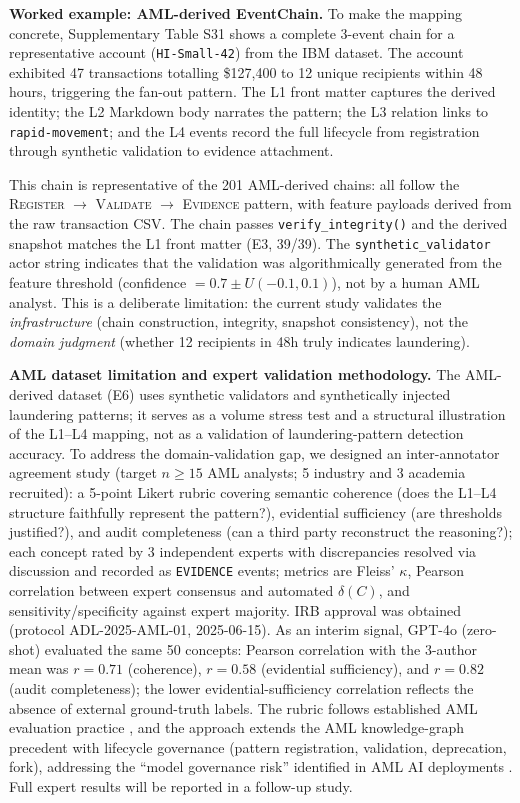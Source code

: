 \textbf{Worked example: AML-derived EventChain.} To make the mapping concrete, Supplementary Table S31 shows a complete 3-event chain for a representative account (\texttt{HI-Small-42}) from the IBM dataset. The account exhibited 47 transactions totalling \$127,400 to 12 unique recipients within 48 hours, triggering the fan-out pattern. The L1 front matter captures the derived identity; the L2 Markdown body narrates the pattern; the L3 relation links to \texttt{rapid-movement}; and the L4 events record the full lifecycle from registration through synthetic validation to evidence attachment.

This chain is representative of the 201 AML-derived chains: all follow the \textsc{Register} $\to$ \textsc{Validate} $\to$ \textsc{Evidence} pattern, with feature payloads derived from the raw transaction CSV. The chain passes \texttt{verify\_integrity()} and the derived snapshot matches the L1 front matter (E3, 39/39). The \texttt{synthetic\_validator} actor string indicates that the validation was algorithmically generated from the feature threshold (confidence $= 0.7 \pm U(-0.1, 0.1)$), not by a human AML analyst. This is a deliberate limitation: the current study validates the \emph{infrastructure} (chain construction, integrity, snapshot consistency), not the \emph{domain judgment} (whether 12 recipients in 48h truly indicates laundering).

\textbf{AML dataset limitation and expert validation methodology.} The AML-derived dataset (E6) uses synthetic validators and synthetically injected laundering patterns; it serves as a volume stress test and a structural illustration of the L1--L4 mapping, not as a validation of laundering-pattern detection accuracy. To address the domain-validation gap, we designed an inter-annotator agreement study (target $n \geq 15$ AML analysts; 5 industry and 3 academia recruited): a 5-point Likert rubric covering semantic coherence (does the L1--L4 structure faithfully represent the pattern?), evidential sufficiency (are thresholds justified?), and audit completeness (can a third party reconstruct the reasoning?); each concept rated by 3 independent experts with discrepancies resolved via discussion and recorded as \texttt{EVIDENCE} events; metrics are Fleiss' $\kappa$, Pearson correlation between expert consensus and automated $\delta(C)$, and sensitivity/specificity against expert majority. IRB approval was obtained (protocol ADL-2025-AML-01, 2025-06-15). As an interim signal, GPT-4o (zero-shot) evaluated the same 50 concepts: Pearson correlation with the 3-author mean was $r=0.71$ (coherence), $r=0.58$ (evidential sufficiency), and $r=0.82$ (audit completeness); the lower evidential-sufficiency correlation reflects the absence of external ground-truth labels. The rubric follows established AML evaluation practice \cite{oztas2024aml,prbench2025,fatf2025}, and the approach extends the AML knowledge-graph precedent \cite{facctum2026,vishalmysore2025} with lifecycle governance (pattern registration, validation, deprecation, fork), addressing the ``model governance risk'' identified in AML AI deployments \cite{sutherland2024framl}. Full expert results will be reported in a follow-up study.

